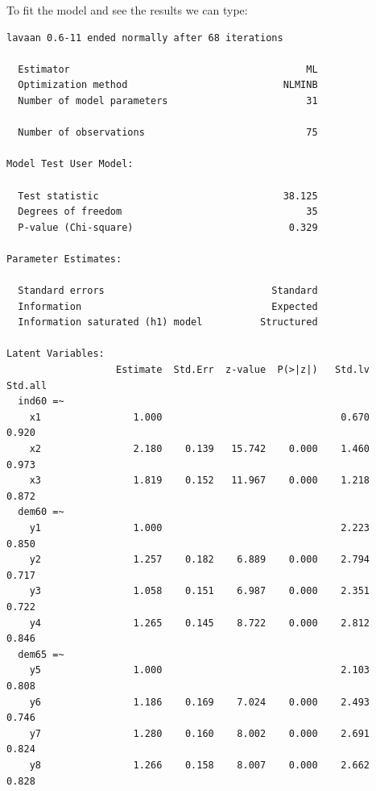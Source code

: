 To fit the model and see the results we can type:

\begin{Shaded}
\begin{Highlighting}[]
\OtherTok{\textless{}{-}} 
 \NormalTok{)}
\end{Highlighting}
\end{Shaded}

\begin{verbatim}
lavaan 0.6-11 ended normally after 68 iterations

  Estimator                                         ML
  Optimization method                           NLMINB
  Number of model parameters                        31
                                                      
  Number of observations                            75
                                                      
Model Test User Model:
                                                      
  Test statistic                                38.125
  Degrees of freedom                                35
  P-value (Chi-square)                           0.329

Parameter Estimates:

  Standard errors                             Standard
  Information                                 Expected
  Information saturated (h1) model          Structured

Latent Variables:
                   Estimate  Std.Err  z-value  P(>|z|)   Std.lv  Std.all
  ind60 =~                                                              
    x1                1.000                               0.670    0.920
    x2                2.180    0.139   15.742    0.000    1.460    0.973
    x3                1.819    0.152   11.967    0.000    1.218    0.872
  dem60 =~                                                              
    y1                1.000                               2.223    0.850
    y2                1.257    0.182    6.889    0.000    2.794    0.717
    y3                1.058    0.151    6.987    0.000    2.351    0.722
    y4                1.265    0.145    8.722    0.000    2.812    0.846
  dem65 =~                                                              
    y5                1.000                               2.103    0.808
    y6                1.186    0.169    7.024    0.000    2.493    0.746
    y7                1.280    0.160    8.002    0.000    2.691    0.824
    y8                1.266    0.158    8.007    0.000    2.662    0.828


\end{verbatim}
